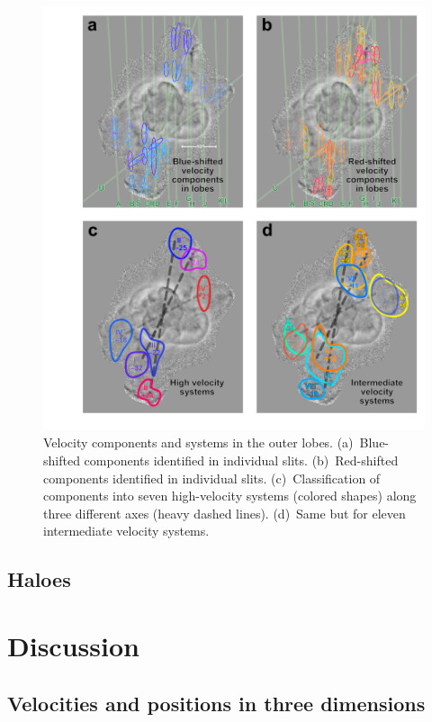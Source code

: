 \documentclass[useAMS, usenatbib, a4paper]{mnras}
\begin{document}
\begin{figure}
  \centering
  \includegraphics[width=\linewidth]{turtle-lobes-simplified}
  \caption{
    Velocity components and systems in the outer lobes.
    (a)~Blue-shifted components identified in individual slits.
    (b)~Red-shifted components identified in individual slits.
    (c)~Classification of components into seven high-velocity systems (colored shapes)
    along three different axes (heavy dashed lines).
    (d)~Same but for eleven intermediate velocity systems.
  }
  \label{fig:outer-lobe-components}
\end{figure}

\subsection{Haloes}
\label{sec:haloes}

\section{Discussion}
\label{sec:discussion}

\subsection{Velocities and positions in three dimensions}
\label{sec:veloc-posit-three}
\end{document}
